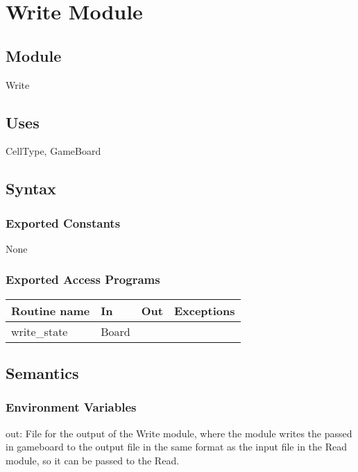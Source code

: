 \documentclass[12pt]{article}
\begin{document}
\newpage

\section* {Write Module}

\subsection* {Module}

Write

\subsection* {Uses}

CellType, GameBoard

\subsection* {Syntax}

\subsubsection* {Exported Constants}

None

\subsubsection* {Exported Access Programs}

\begin{tabular}{| l | l | l | l |}
\hline
\textbf{Routine name} & \textbf{In} & \textbf{Out} & \textbf{Exceptions}\\
\hline
write\_state & Board & ~ & ~\\
\hline
\end{tabular}

\subsection* {Semantics}

\subsubsection* {Environment Variables}

out: File for the output of the Write module, where the module writes the passed in gameboard to the output file in the same format as the input file in the Read module, so it can be passed to the Read.
\end{document}
